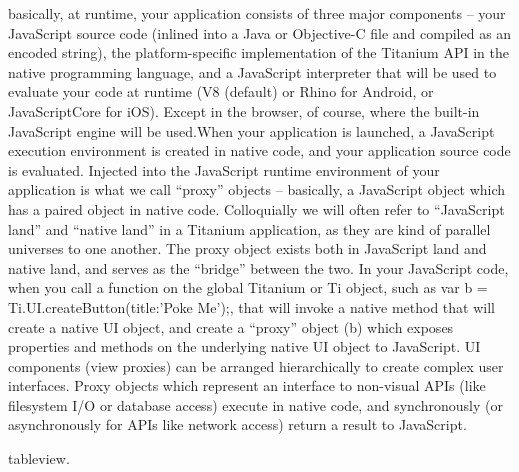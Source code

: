 basically, at runtime, your application consists of three major components – your JavaScript source code (inlined into a Java or Objective-C file and compiled as an encoded string), the platform-specific implementation of the Titanium API in the native programming language, and a JavaScript interpreter that will be used to evaluate your code at runtime (V8 (default) or Rhino for Android, or JavaScriptCore for iOS). Except in the browser, of course, where the built-in JavaScript engine will be used.When your application is launched, a JavaScript execution environment is created in native code, and your application source code is evaluated. Injected into the JavaScript runtime environment of your application is what we call “proxy” objects – basically, a JavaScript object which has a paired object in native code. Colloquially we will often refer to “JavaScript land” and “native land” in a Titanium application, as they are kind of parallel universes to one another. The proxy object exists both in JavaScript land and native land, and serves as the “bridge” between the two.
In your JavaScript code, when you call a function on the global Titanium or Ti object, such as var b = Ti.UI.createButton({title:'Poke Me'});, that will invoke a native method that will create a native UI object, and create a “proxy” object (b) which exposes properties and methods on the underlying native UI object to JavaScript.
UI components (view proxies) can be arranged hierarchically to create complex user interfaces. Proxy objects which represent an interface to non-visual APIs (like filesystem I/O or database access) execute in native code, and synchronously (or asynchronously for APIs like network access) return a result to JavaScript. \cite{Whinnery2012}

tableview.